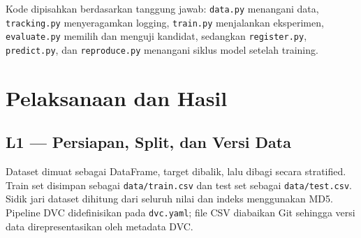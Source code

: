 \documentclass[11pt,a4paper]{article}
\begin{document}
\begin{center}
\end{center}

Kode dipisahkan berdasarkan tanggung jawab: \texttt{data.py} menangani data, \texttt{tracking.py} menyeragamkan logging, \texttt{train.py} menjalankan eksperimen, \texttt{evaluate.py} memilih dan menguji kandidat, sedangkan \texttt{register.py}, \texttt{predict.py}, dan \texttt{reproduce.py} menangani siklus model setelah training.

\section{Pelaksanaan dan Hasil}

\subsection{L1 --- Persiapan, Split, dan Versi Data}

Dataset dimuat sebagai DataFrame, target dibalik, lalu dibagi secara stratified. Train set disimpan sebagai \texttt{data/train.csv} dan test set sebagai \texttt{data/test.csv}. Sidik jari dataset dihitung dari seluruh nilai dan indeks menggunakan MD5. Pipeline DVC didefinisikan pada \texttt{dvc.yaml}; file CSV diabaikan Git sehingga versi data direpresentasikan oleh metadata DVC.
\end{document}
